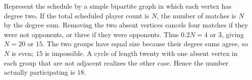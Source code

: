 Represent the schedule by a simple bipartite graph in which each vertex has degree two. If the total scheduled player count is $N$, the number of matches is $N$ by the degree sum. Removing the two absent vertices cancels four matches if they were not opponents, or three if they were opponents. Thus $0.2N=4$ or $3$, giving $N=20$ or $15$. The two groups have equal size because their degree sums agree, so $N$ is even; $15$ is impossible. A cycle of length twenty with one absent vertex in each group that are not adjacent realizes the other case. Hence the number actually participating is $\boxed{18}$.
